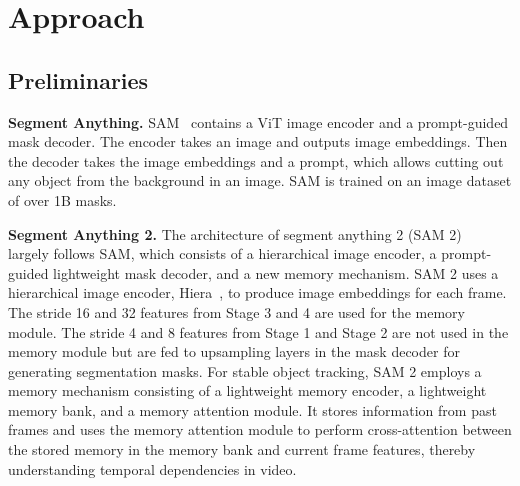 \section{Approach}
\subsection{Preliminaries}
\noindent \textbf{Segment Anything.} SAM~\citep{kirillov2023segment} contains a  ViT image encoder and a prompt-guided mask decoder. The encoder takes an image and outputs image embeddings. Then the decoder takes the image embeddings and a prompt, which allows cutting out any object from the background in an image. 
SAM is trained on an image dataset of over 1B masks.

\noindent \textbf{Segment Anything 2.} The architecture of segment anything 2 (SAM 2)~\citep{ravi2024sam} largely follows SAM, which consists of a hierarchical image encoder, a prompt-guided lightweight mask decoder, and a new memory mechanism. SAM 2 uses a hierarchical image encoder, Hiera~\citep{ryali2023hiera}, to produce image embeddings for each frame. The stride 16 and 32 features from Stage 3 and 4 are used for the memory module. The stride 4 and 8 features from Stage 1 and Stage 2 are not used in the memory module but are fed to upsampling layers in the mask decoder for generating segmentation masks. For stable object tracking, SAM 2 employs a memory mechanism consisting of a lightweight memory encoder, a lightweight memory bank, and a memory attention module. It stores information from past frames and uses the memory attention module to perform cross-attention between the stored memory in the memory bank and current frame features, thereby understanding temporal dependencies in video.


